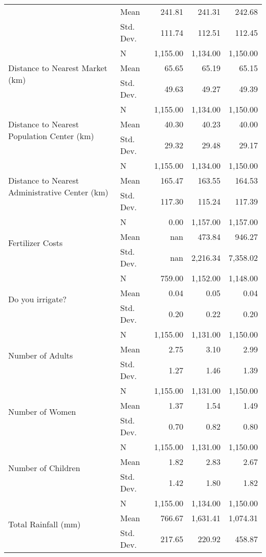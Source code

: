 \begin{table}
\begin{tabular}{llrrr}
 & Mean & 241.81 & 241.31 & 242.68 \\
 & Std. Dev. & 111.74 & 112.51 & 112.45 \\
\multirow[c]{3}{*}{Distance to Nearest Market (km)} & N & 1,155.00 & 1,134.00 & 1,150.00 \\
 & Mean & 65.65 & 65.19 & 65.15 \\
 & Std. Dev. & 49.63 & 49.27 & 49.39 \\
\multirow[c]{3}{*}{Distance to Nearest Population Center (km)} & N & 1,155.00 & 1,134.00 & 1,150.00 \\
 & Mean & 40.30 & 40.23 & 40.00 \\
 & Std. Dev. & 29.32 & 29.48 & 29.17 \\
\multirow[c]{3}{*}{Distance to Nearest Administrative Center (km)} & N & 1,155.00 & 1,134.00 & 1,150.00 \\
 & Mean & 165.47 & 163.55 & 164.53 \\
 & Std. Dev. & 117.30 & 115.24 & 117.39 \\
\multirow[c]{3}{*}{Fertilizer Costs} & N & 0.00 & 1,157.00 & 1,157.00 \\
 & Mean & nan & 473.84 & 946.27 \\
 & Std. Dev. & nan & 2,216.34 & 7,358.02 \\
\multirow[c]{3}{*}{Do you irrigate?} & N & 759.00 & 1,152.00 & 1,148.00 \\
 & Mean & 0.04 & 0.05 & 0.04 \\
 & Std. Dev. & 0.20 & 0.22 & 0.20 \\
\multirow[c]{3}{*}{Number of Adults} & N & 1,155.00 & 1,131.00 & 1,150.00 \\
 & Mean & 2.75 & 3.10 & 2.99 \\
 & Std. Dev. & 1.27 & 1.46 & 1.39 \\
\multirow[c]{3}{*}{Number of Women} & N & 1,155.00 & 1,131.00 & 1,150.00 \\
 & Mean & 1.37 & 1.54 & 1.49 \\
 & Std. Dev. & 0.70 & 0.82 & 0.80 \\
\multirow[c]{3}{*}{Number of Children} & N & 1,155.00 & 1,131.00 & 1,150.00 \\
 & Mean & 1.82 & 2.83 & 2.67 \\
 & Std. Dev. & 1.42 & 1.80 & 1.82 \\
\multirow[c]{3}{*}{Total Rainfall (mm)} & N & 1,155.00 & 1,134.00 & 1,150.00 \\
 & Mean & 766.67 & 1,631.41 & 1,074.31 \\
 & Std. Dev. & 217.65 & 220.92 & 458.87 \\

\end{tabular}
\end{table}
